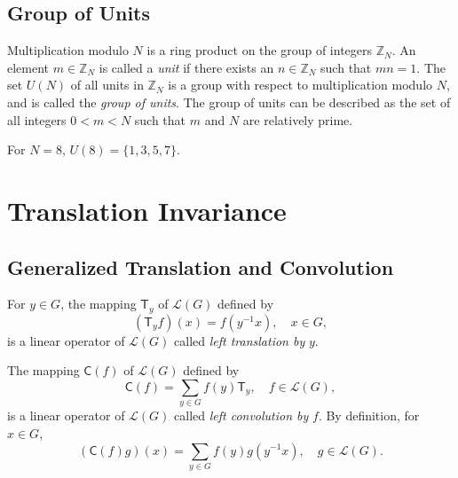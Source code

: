 \documentclass[reqno,onecolumn,oneside]{paper}
\newcommand{\<}{\ensuremath{\langle}}
\renewcommand{\>}{\ensuremath{\rangle}}
\newcommand{\field}[1]{\ensuremath{\mathbb{#1}}}
\newcommand{\Z}{\field{Z}}                   %
\newcommand{\vs}[1]{\ensuremath{\mathcal{#1}}}
\newcommand{\LG}{\vs{L}(G)}        %
\newcommand{\lt}[1]{\ensuremath{\mathsf{#1}}}
\begin{document}
\subsection{Group of Units}
Multiplication modulo $N$ is a ring product on the group of
integers $\Z_N$. An element $m\in \Z_N$ is called a {\it unit} if
there exists an $n\in \Z_N$ such that $mn = 1$.  The set
$U(N)$ of all units in $\Z_N$ is a group with respect to
multiplication modulo $N$, and is called the 
\emph{group of units}.%
The group of units can be described %
as the set of all integers $0<m<N$ such that $m$ and $N$ are
relatively prime.  
\begin{example}
For $N=8$, 
$U(8) = \{1, 3, 5, 7\}$.
\end{example}

\section{Translation Invariance}
\subsection{Generalized Translation and Convolution}
For $y\in G$, the mapping $\lt{T}_y$ of $\LG$ defined by 
\begin{equation}\label{eq:trans}
(\lt{T}_yf)(x) = f(y^{-1}x), \quad x \in G,
\end{equation}
is a linear operator of $\LG$ called 
\emph{left translation by} $y$.

The mapping $\lt{C}(f)$ of $\LG$ defined by 
\begin{equation}
\lt{C}(f) = \sum_{y\in G} f(y) \lt{T}_y, \quad f\in \LG,
\end{equation}
is a linear operator of $\LG$ called 
\emph{left convolution by} $f$.  By definition, for $x\in G$,
\begin{equation}\label{eq:conv}
(\lt{C}(f)g)(x) = \sum_{y\in G} f(y) g(y^{-1}x), \quad g \in \LG.
\end{equation}
\end{document}
